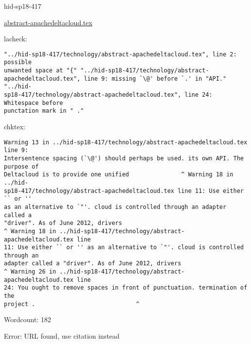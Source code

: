 

\begin{IU}

hid-sp18-417

\href{https://github.com/cloudmesh-community/hid-sp18-417/blob/master//technology/abstract-apachedeltacloud.tex}{abstract-apachedeltacloud.tex}

 
lacheck:
\begin{tiny}
\begin{verbatim}
"../hid-sp18-417/technology/abstract-apachedeltacloud.tex", line 2: possible
unwanted space at "{" "../hid-sp18-417/technology/abstract-
apachedeltacloud.tex", line 9: missing `\@' before `.' in "API." "../hid-
sp18-417/technology/abstract-apachedeltacloud.tex", line 24: Whitespace before
punctation mark in " ."
\end{verbatim}
\end{tiny}
chktex:
\begin{tiny}
\begin{verbatim}
Warning 13 in ../hid-sp18-417/technology/abstract-apachedeltacloud.tex line 9:
Intersentence spacing (`\@') should perhaps be used. its own API. The purpose of
Deltacloud is to provide one unified               ^ Warning 18 in ../hid-
sp18-417/technology/abstract-apachedeltacloud.tex line 11: Use either `` or ''
as an alternative to `"'. cloud is controlled through an adapter called a
"driver". As of June 2012, drivers
^ Warning 18 in ../hid-sp18-417/technology/abstract-apachedeltacloud.tex line
11: Use either `` or '' as an alternative to `"'. cloud is controlled through an
adapter called a "driver". As of June 2012, drivers
^ Warning 26 in ../hid-sp18-417/technology/abstract-apachedeltacloud.tex line
24: You ought to remove spaces in front of punctuation. termination of the
project .                             ^
\end{verbatim}
\end{tiny}

Wordcount: 182

Error: URL found, use citation instead
\end{IU}



